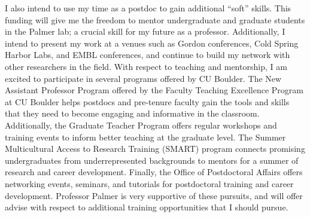 \documentclass{F32}
\begin{document}

I also intend to use my time as a postdoc to gain additional ``soft'' skills. This funding will give me the freedom to mentor undergraduate and graduate students in the Palmer lab; a crucial skill for my future as a professor. Additionally, I intend to present my work at a venues such as Gordon conferences, Cold Spring Harbor Labs, and EMBL conferences, and continue to build my network with other researchers in the field. With respect to teaching and mentorship, I am excited to participate in several programs offered by CU Boulder. The New Assistant Professor Program offered by the Faculty Teaching Excellence Program at CU Boulder helps postdocs and pre-tenure faculty gain the tools and skills that they need to become engaging and informative in the classroom. Additionally, the Graduate Teacher Program offers regular workshops and training events to inform better teaching at the graduate level. The Summer Multicultural Access to Research Training (SMART) program connects promising undergraduates from underrepresented backgrounds to mentors for a summer of research and career development. Finally, the Office of Postdoctoral Affairs offers networking events, seminars, and tutorials for postdoctoral training and career development. Professor Palmer is very supportive of these pursuits, and will offer advise with respect to additional training opportunities that I should pursue.

\end{document}

